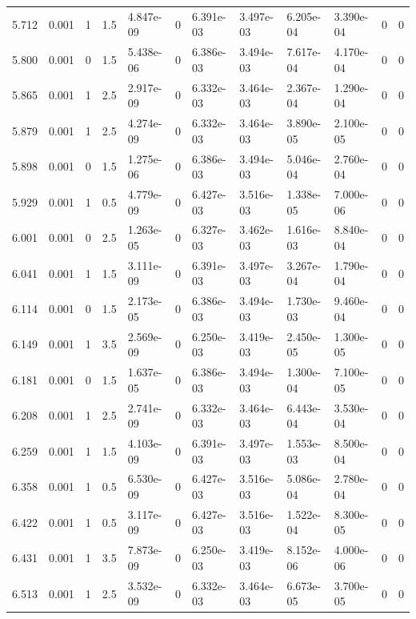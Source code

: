 \documentclass[preview]{standalone}
\begin{document}
{{{\begin{tabular}{L{1.2cm}C{1.2cm} C{0.3cm}C{0.5cm} C{1.4cm}C{1.4cm} C{1.4cm}C{1.4cm} C{1.6cm}C{1.6cm} C{1.6cm}C{1.6cm}}
  5.712  &  0.001  & 1     & 1.5 &  4.847e-09  & 0  &  6.391e-03&   3.497e-03& 6.205e-04 & 3.390e-04   &  0 & 0  \\ 
  5.800  &  0.001  & 0     & 1.5 &  5.438e-06  & 0  &  6.386e-03&   3.494e-03& 7.617e-04 & 4.170e-04   &  0 & 0  \\ 
  5.865  &  0.001  & 1     & 2.5 &  2.917e-09  & 0  &  6.332e-03&   3.464e-03& 2.367e-04 & 1.290e-04   &  0 & 0  \\ 
  5.879  &  0.001  & 1     & 2.5 &  4.274e-09  & 0  &  6.332e-03&   3.464e-03& 3.890e-05 & 2.100e-05   &  0 & 0  \\ 
  5.898  &  0.001  & 0     & 1.5 &  1.275e-06  & 0  &  6.386e-03&   3.494e-03& 5.046e-04 & 2.760e-04   &  0 & 0  \\ 
  5.929  &  0.001  & 1     & 0.5 &  4.779e-09  & 0  &  6.427e-03&   3.516e-03& 1.338e-05 & 7.000e-06   &  0 & 0  \\ 
  6.001  &  0.001  & 0     & 2.5 &  1.263e-05  & 0  &  6.327e-03&   3.462e-03& 1.616e-03 & 8.840e-04   &  0 & 0  \\ 
  6.041  &  0.001  & 1     & 1.5 &  3.111e-09  & 0  &  6.391e-03&   3.497e-03& 3.267e-04 & 1.790e-04   &  0 & 0  \\ 
  6.114  &  0.001  & 0     & 1.5 &  2.173e-05  & 0  &  6.386e-03&   3.494e-03& 1.730e-03 & 9.460e-04   &  0 & 0  \\ 
  6.149  &  0.001  & 1     & 3.5 &  2.569e-09  & 0  &  6.250e-03&   3.419e-03& 2.450e-05 & 1.300e-05   &  0 & 0  \\ 
  6.181  &  0.001  & 0     & 1.5 &  1.637e-05  & 0  &  6.386e-03&   3.494e-03& 1.300e-04 & 7.100e-05   &  0 & 0  \\ 
  6.208  &  0.001  & 1     & 2.5 &  2.741e-09  & 0  &  6.332e-03&   3.464e-03& 6.443e-04 & 3.530e-04   &  0 & 0  \\ 
  6.259  &  0.001  & 1     & 1.5 &  4.103e-09  & 0  &  6.391e-03&   3.497e-03& 1.553e-03 & 8.500e-04   &  0 & 0  \\ 
  6.358  &  0.001  & 1     & 0.5 &  6.530e-09  & 0  &  6.427e-03&   3.516e-03& 5.086e-04 & 2.780e-04   &  0 & 0  \\ 
  6.422  &  0.001  & 1     & 0.5 &  3.117e-09  & 0  &  6.427e-03&   3.516e-03& 1.522e-04 & 8.300e-05   &  0 & 0  \\ 
  6.431  &  0.001  & 1     & 3.5 &  7.873e-09  & 0  &  6.250e-03&   3.419e-03& 8.152e-06 & 4.000e-06   &  0 & 0  \\ 
  6.513  &  0.001  & 1     & 2.5 &  3.532e-09  & 0  &  6.332e-03&   3.464e-03& 6.673e-05 & 3.700e-05   &  0 & 0  \\ 

\end{tabular}}}}
\end{document}

